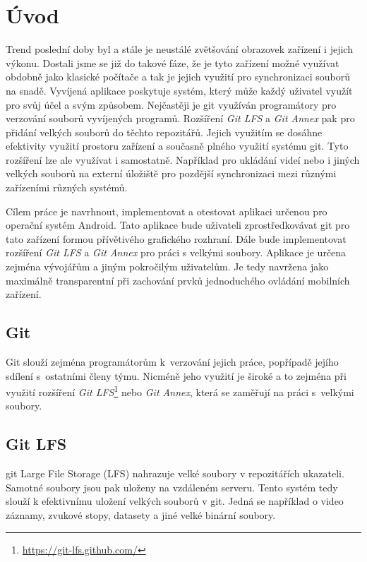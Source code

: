 \chapter{Úvod}
Trend poslední doby byl a stále je neustálé zvětšování obrazovek zařízení i jejich výkonu. Dostali jsme se již do takové fáze, že je tyto zařízení možné využívat obdobně jako klasické počítače a tak je jejich využití pro synchronizaci souborů na snadě.
Vyvíjená aplikace poskytuje systém, který může každý uživatel využít pro svůj účel a svým způsobem. Nejčastěji je git využíván programátory pro verzování souborů vyvíjených programů. Rozšíření \emph{Git LFS} a \emph{Git Annex} pak pro přidání velkých souborů do těchto repozitářů. Jejich využitím se dosáhne efektivity využití prostoru zařízení a současně plného využití systému git. Tyto rozšíření lze ale využívat i samostatně. Například pro ukládání videí nebo i jiných velkých souborů na externí úložiště pro pozdější synchronizaci mezi různými zařízeními různých systémů.

Cílem práce je navrhnout, implementovat a otestovat aplikaci určenou pro operační systém Android. Tato aplikace bude uživateli zprostředkovávat git pro tato zařízení formou přívětivého grafického rozhraní. Dále bude implementovat rozšíření \emph{Git LFS} a \emph{Git Annex} pro práci s velkými soubory. Aplikace je určena zejména vývojářům a jiným pokročilým uživatelům. Je tedy navržena jako maximálně transparentní při zachování prvků jednoduchého ovládání mobilních zařízení.

\newpage
\section{Git}
Git slouží zejména programátorům k verzování jejich práce, popřípadě jejího sdílení s ostatními členy týmu. Nicméně jeho využití je široké a to zejména při využití rozšíření \emph{Git LFS}\footnote{\label{foot:git-lfs}\url{https://git-lfs.github.com/}} nebo \emph{Git Annex}, která se zaměřují na práci s velkými soubory.

\section{Git LFS}
git Large File Storage (LFS) nahrazuje velké soubory v repozitářích ukazateli. Samotné soubory jsou pak uloženy na vzdáleném serveru. Tento systém tedy slouží k efektivnímu uložení velkých souborů v git. Jedná se například o video záznamy, zvukové stopy, datasety a jiné velké binární soubory.

